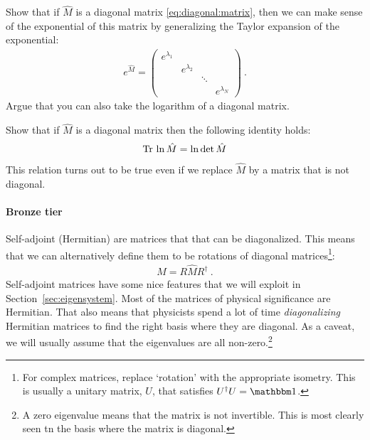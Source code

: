 \documentclass[12pt]{article}
\begin{document}
\begin{exercise}
Show that if $\hat M$ is a diagonal matrix \eqref{eq:diagonal:matrix}, then we can make sense of the exponential of this matrix by generalizing the Taylor expansion of the exponential:
\begin{align}
e^{\hat M} = 
    \begin{pmatrix}
        e^{\lambda_1} & & & \\
         & e^{\lambda_2} & & \\
         & & \ddots & \\
         & & & e^{\lambda_N}
    \end{pmatrix} \ .
    \label{eq:diagonal:matrix:exponential}
\end{align}
Argue that you can also take the logarithm of a diagonal matrix. 
\end{exercise}


\begin{exercise}
Show that if $\hat M$ is a diagonal matrix then the following identity holds:
\begin{align}
\textnormal{Tr}\, \ln \hat M = \ln \det \hat M
\label{eq:tr:log:M:eq:ln:det:M:diag}
\end{align}
This relation turns out to be true even if we replace $\hat M$ by a matrix that is not diagonal.
\end{exercise}



\paragraph{Bronze tier} Self-adjoint (Hermitian) are matrices that that can be diagonalized. This means that we can alternatively define them to be rotations of diagonal matrices\footnote{For complex matrices, replace `rotation' with the appropriate isometry. This is usually a unitary matrix, $U$, that satisfies $U^\dag U = \one$.}:
\begin{align}
    M = R \hat M R^\dag \ .
\end{align}
Self-adjoint matrices have some nice features that we will exploit in Section~\ref{sec:eigensystem}. Most of the matrices of physical significance are Hermitian. That also means that physicists spend a lot of time \emph{diagonalizing} Hermitian matrices to find the right basis where they are diagonal. As a caveat, we will usually assume that the eigenvalues are all non-zero.\footnote{A zero eigenvalue means that the matrix is not invertible. This is most clearly seen tn the basis where the matrix is diagonal.}
\end{document}

